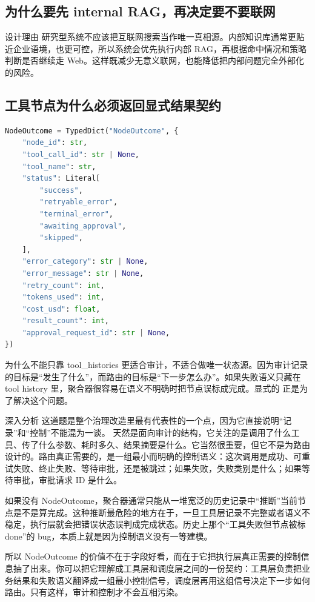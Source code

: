 \documentclass[12pt]{article}
\begin{document}
\subsection{为什么要先 internal RAG，再决定要不要联网}
\begin{qaBox}{设计理由}
研究型系统不应该把互联网搜索当作唯一真相源。内部知识库通常更贴近企业语境，也更可控，所以系统会优先执行内部 RAG，再根据命中情况和策略判断是否继续走 Web。这样既减少无意义联网，也能降低把内部问题完全外部化的风险。
\end{qaBox}

\subsection{工具节点为什么必须返回显式结果契约}
\begin{lstlisting}[language=Python,caption={NodeOutcome 契约}]
NodeOutcome = TypedDict("NodeOutcome", {
    "node_id": str,
    "tool_call_id": str | None,
    "tool_name": str,
    "status": Literal[
        "success",
        "retryable_error",
        "terminal_error",
        "awaiting_approval",
        "skipped",
    ],
    "error_category": str | None,
    "error_message": str | None,
    "retry_count": int,
    "tokens_used": int,
    "cost_usd": float,
    "result_count": int,
    "approval_request_id": str | None,
})
\end{lstlisting}

\begin{qaBox}{为什么不能只靠 tool\_histories}
 更适合审计，不适合做唯一状态源。因为审计记录的目标是“发生了什么”，而路由的目标是“下一步怎么办”。如果失败语义只藏在 tool history 里，聚合器很容易在语义不明确时把节点误标成完成。显式的  正是为了解决这个问题。
\end{qaBox}

\begin{analysisBox}{深入分析}
这道题是整个治理改造里最有代表性的一个点，因为它直接说明“记录”和“控制”不能混为一谈。 天然是面向审计的结构，它关注的是调用了什么工具、传了什么参数、耗时多久、结果摘要是什么。它当然很重要，但它不是为路由设计的。路由真正需要的，是一组最小而明确的控制语义：这次调用是成功、可重试失败、终止失败、等待审批，还是被跳过；如果失败，失败类别是什么；如果等待审批，审批请求 ID 是什么。

如果没有 NodeOutcome，聚合器通常只能从一堆宽泛的历史记录中“推断”当前节点是不是算完成。这种推断最危险的地方在于，一旦工具层记录不完整或者语义不稳定，执行层就会把错误状态误判成完成状态。历史上那个“工具失败但节点被标 done”的 bug，本质上就是因为控制语义没有一等建模。

所以 NodeOutcome 的价值不在于字段好看，而在于它把执行层真正需要的控制信息抽了出来。你可以把它理解成工具层和调度层之间的一份契约：工具层负责把业务结果和失败语义翻译成一组最小控制信号，调度层再用这组信号决定下一步如何路由。只有这样，审计和控制才不会互相污染。
\end{analysisBox}
\end{document}

